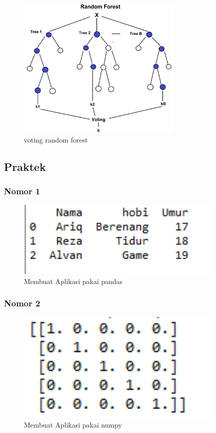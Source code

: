 \begin{figure}[H]
	\centering
	\includegraphics[width=8cm]{figures/1174087/3/4.png}
	\caption{voting random forest}
\end{figure}

\subsection{Praktek}
\subsubsection{Nomor 1}
\hfill\break

\begin{figure}[H]
\centerline{\includegraphics[width=10cm]{figures/1174087/3/5.png}}
\caption{Membuat Aplikasi pakai pandas}
\label{labelgambar}
\end{figure}

\subsubsection{Nomor 2}
\hfill\break

\begin{figure}[H]
\centerline{\includegraphics[width=10cm]{figures/1174087/3/6.png}}
\caption{Membuat Aplikasi pakai numpy}
\label{labelgambar}
\end{figure}

